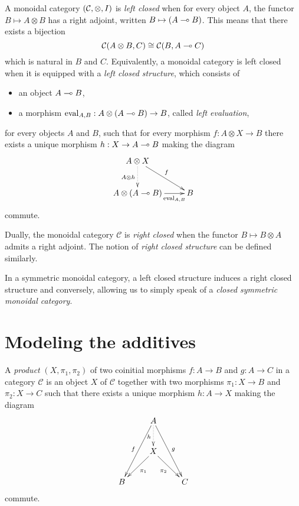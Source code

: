 \begin{definition}\label{smcc}
A monoidal category $(\mathcal{C},\otimes,I)$ is \emph{left closed} when for every object $A$, the functor $B\mapsto A\otimes B$ has a right adjoint, written $B\mapsto(A\multimap B)$.
This means that there exists a bijection
\begin{equation*}
\mathcal{C}(A\otimes B, C) \cong \mathcal{C}(B,A\multimap C)
\end{equation*}
which is natural in $B$ and $C$.
Equivalently, a monoidal category is left closed when it is equipped with a \emph{left closed structure}, which consists of
\begin{itemize}
\item an object $A\multimap B$,
\item a morphism $\mathrm{eval}_{A,B}:A\otimes (A\multimap B)\to B$, called \emph{left evaluation},
\end{itemize}
for every objects $A$ and $B$, such that for every morphism $f:A\otimes X\to B$ there exists a unique morphism $h:X\to A\multimap B$ making the diagram
\begin{equation*}
\xymatrix{
A\tens X\ar@{.>}[d]_{A\tens h}\ar[dr]^{f}\\
A\tens(A\limp B)\ar[r]_-{\mathrm{eval}_{A,B}}& B
}
\end{equation*}
commute.

Dually, the monoidal category $\mathcal{C}$ is \emph{right closed} when the functor $B\mapsto B\otimes A$ admits a right adjoint. The notion of \emph{right closed structure} can be defined similarly.
\end{definition}

In a symmetric monoidal category, a left closed structure induces a
right closed structure and conversely, allowing us to simply speak of a
\emph{closed symmetric monoidal category}.

\section{Modeling the additives}\label{modeling-the-additives}

\begin{definition}[Product]\label{cartesianproduct}
A \emph{product} $(X,\pi_1,\pi_2)$ of two coinitial morphisms $f:A\to B$ and $g:A\to C$ in a category $\mathcal{C}$ is an object $X$ of $\mathcal{C}$ together with two morphisms $\pi_1:X\to B$ and $\pi_2:X\to C$ such that there exists a unique morphism $h:A\to X$ making the diagram
\begin{equation*}
\xymatrix{
& \ar[ddl]_fA\ar@{.>}[d]_h\ar[ddr]^g& \\
& \ar[dl]^{\pi_1}X\ar[dr]_{\pi_2}& \\
B& & C
}
\end{equation*}
commute.
\end{definition}

